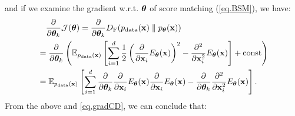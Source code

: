 \documentclass{article}
\begin{document}
and if we examine the gradient w.r.t. ${\bm{\theta}}$ of score matching (\eqref{eq.BSM}), we have:
\begin{equation}
    \begin{aligned}
        &\quad \frac{\partial}{\partial {\bm{\theta}}_k} \mathcal{J}({\bm{\theta}}) = \frac{\partial}{\partial {\bm{\theta}}_k} D_{\mathrm{F}}(p_{\rm{data}}({\mathbf{x}}) \parallel p_{\bm{\theta}}({\mathbf{x}})) \\
        &= \frac{\partial}{\partial {\bm{\theta}}_k} \left( \mathbb{E}_{p_{\rm{data}}({\mathbf{x}})}\left[ \sum_{i=1}^d\frac{1}{2}\left( \frac{\partial}{\partial {\mathbf{x}}_i}E_{\bm{\theta}}({\mathbf{x}}) \right)^2 - \frac{\partial^2}{\partial {\mathbf{x}}_i^2}E_{\bm{\theta}}({\mathbf{x}})\right] + \text{const} \right) \\
        &= \mathbb{E}_{p_{\rm{data}}({\mathbf{x}})}\left[ \sum_{i=1}^d \frac{\partial}{\partial {\bm{\theta}}_k}\frac{\partial}{\partial {\mathbf{x}}_i}E_{\bm{\theta}}({\mathbf{x}})\frac{\partial}{\partial {\mathbf{x}}_i}E_{\bm{\theta}}({\mathbf{x}}) - \frac{\partial}{\partial {\bm{\theta}}_k} \frac{\partial^2}{\partial {\mathbf{x}}_i^2}E_{\bm{\theta}}({\mathbf{x}})\right].
    \end{aligned}
\end{equation}
From the above and \eqref{eq.gradCD}, we can conclude that:
\end{document}
